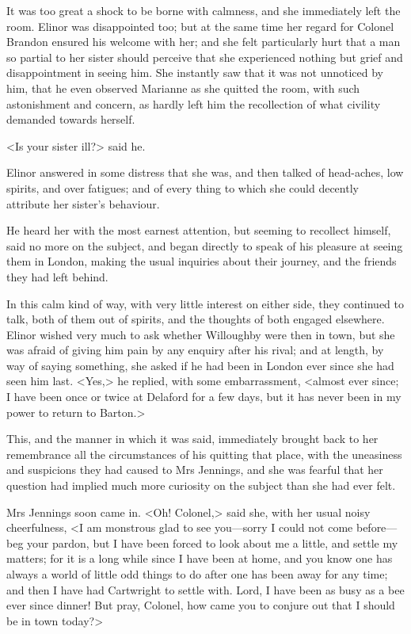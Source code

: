 It was too great a shock to be borne with calmness, and she immediately left the room. Elinor was disappointed too; but at the same time her regard for Colonel Brandon ensured his welcome with her; and she felt particularly hurt that a man so partial to her sister should perceive that she experienced nothing but grief and disappointment in seeing him. She instantly saw that it was not unnoticed by him, that he even observed Marianne as she quitted the room, with such astonishment and concern, as hardly left him the recollection of what civility demanded towards herself.

<Is your sister ill?> said he.

Elinor answered in some distress that she was, and then talked of head-aches, low spirits, and over fatigues; and of every thing to which she could decently attribute her sister's behaviour.

He heard her with the most earnest attention, but seeming to recollect himself, said no more on the subject, and began directly to speak of his pleasure at seeing them in London, making the usual inquiries about their journey, and the friends they had left behind.

In this calm kind of way, with very little interest on either side, they continued to talk, both of them out of spirits, and the thoughts of both engaged elsewhere. Elinor wished very much to ask whether Willoughby were then in town, but she was afraid of giving him pain by any enquiry after his rival; and at length, by way of saying something, she asked if he had been in London ever since she had seen him last. <Yes,> he replied, with some embarrassment, <almost ever since; I have been once or twice at Delaford for a few days, but it has never been in my power to return to Barton.>

This, and the manner in which it was said, immediately brought back to her remembrance all the circumstances of his quitting that place, with the uneasiness and suspicions they had caused to Mrs Jennings, and she was fearful that her question had implied much more curiosity on the subject than she had ever felt.

Mrs Jennings soon came in. <Oh! Colonel,> said she, with her usual noisy cheerfulness, <I am monstrous glad to see you—sorry I could not come before—beg your pardon, but I have been forced to look about me a little, and settle my matters; for it is a long while since I have been at home, and you know one has always a world of little odd things to do after one has been away for any time; and then I have had Cartwright to settle with. Lord, I have been as busy as a bee ever since dinner! But pray, Colonel, how came you to conjure out that I should be in town today?>

